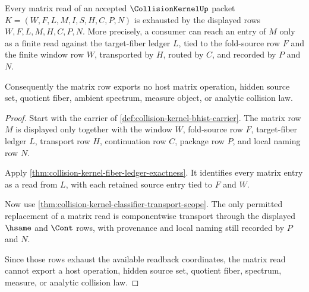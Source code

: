\begin{theorem}
\label{thm:collision-kernel-matrix-readback-totality}
Every matrix read of an accepted $\CollisionKernelUp$ packet $K=(W,F,L,M,I,S,H,C,P,N)$ is exhausted by the displayed rows $W,F,L,M,H,C,P,N$. More precisely, a consumer can reach an entry of $M$ only as a finite read against the target-fiber ledger $L$, tied to the fold-source row $F$ and the finite window row $W$, transported by $H$, routed by $C$, and recorded by $P$ and $N$.

Consequently the matrix row exports no host matrix operation, hidden source set, quotient fiber, ambient spectrum, measure object, or analytic collision law.
\end{theorem}
\begin{proof}
Start with the carrier of \autoref{def:collision-kernel-bhist-carrier}. The matrix row $M$ is displayed only together with the window $W$, fold-source row $F$, target-fiber ledger $L$, transport row $H$, continuation row $C$, package row $P$, and local naming row $N$.

Apply \autoref{thm:collision-kernel-fiber-ledger-exactness}. It identifies every matrix entry as a read from $L$, with each retained source entry tied to $F$ and $W$.

Now use \autoref{thm:collision-kernel-classifier-transport-scope}. The only permitted replacement of a matrix read is componentwise transport through the displayed $\hsame$ and $\Cont$ rows, with provenance and local naming still recorded by $P$ and $N$.

Since those rows exhaust the available readback coordinates, the matrix read cannot export a host operation, hidden source set, quotient fiber, spectrum, measure, or analytic collision law.
\end{proof}

